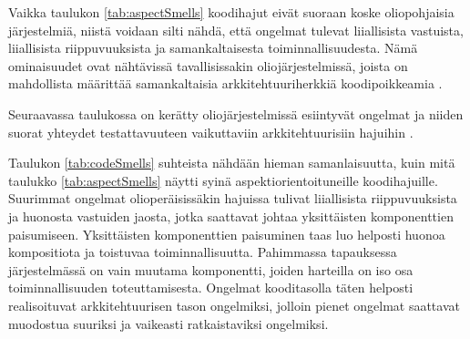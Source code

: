 \documentclass[finnish]{tktltiki2}
\numberwithin{table}{section}
\theoremstyle{definition}
\theoremstyle{remark}
\begin{document}

\noindent
Vaikka taulukon \ref{tab:aspectSmells} koodihajut eivät suoraan koske oliopohjaisia järjestelmiä, niistä voidaan silti nähdä, että ongelmat tulevat liiallisista vastuista, liiallisista riippuvuuksista ja samankaltaisesta toiminnallisuudesta. Nämä ominaisuudet ovat nähtävissä tavallisissakin oliojärjestelmissä, joista on mahdollista määrittää samankaltaisia  arkkitehtuuriherkkiä koodipoikkeamia \citep{macia_enhancing_2013}.

Seuraavassa taulukossa on kerätty oliojärjestelmissä esiintyvät ongelmat ja niiden suorat yhteydet testattavuuteen vaikuttaviin arkkitehtuurisiin hajuihin \citep{macia_enhancing_2013}.



\begin{table}[h]
	\centering
	\setlength{\extrarowheight}{1pt}%
	\caption{Olioperäisten koodihajujen ja arkkitehtuuristen hajujen suhde, sekä niiden syyt.}
	\label{tab:codeSmells}
\end{table}


\noindent
Taulukon \ref{tab:codeSmells} suhteista nähdään hieman samanlaisuutta, kuin mitä taulukko \ref{tab:aspectSmells} näytti syinä aspektiorientoituneille koodihajuille. Suurimmat ongelmat olioperäisissäkin hajuissa tulivat liiallisista riippuvuuksista ja huonosta vastuiden jaosta, jotka saattavat johtaa yksittäisten komponenttien paisumiseen. Yksittäisten komponenttien paisuminen taas luo helposti huonoa kompositiota ja toistuvaa toiminnallisuutta. Pahimmassa tapauksessa järjestelmässä on vain muutama komponentti, joiden harteilla on iso osa toiminnallisuuden toteuttamisesta. 
Ongelmat kooditasolla täten helposti realisoituvat arkkitehtuurisen tason ongelmiksi, jolloin pienet ongelmat saattavat muodostua suuriksi ja vaikeasti ratkaistaviksi ongelmiksi.
\end{document}

